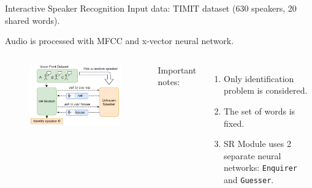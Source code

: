 \documentclass[11pt, aspectratio=169]{beamer}
\newcommand{\guesser}{\texttt{Guesser}}
\newcommand{\enquirer}{\texttt{Enquirer}}
\newcommand{\rimgscale}{0.7}
\begin{document}
\begin{frame}{Interactive Speaker Recognition}
    Input data: TIMIT dataset (630 speakers, 20 shared words).

    Audio is processed with MFCC and x-vector neural network.

    \begin{columns}[c]
        \begin{figure}[bht]
            \includegraphics[scale=\rimgscale]{isr_game.png}
        \end{figure}

        Important notes:
        \begin{enumerate}
            \item Only identification problem is considered.
            \item The set of words is fixed.
            \item SR Module uses 2 separate neural networks: \enquirer{} and
            \guesser{}.
        \end{enumerate}
        \end{columns}
\end{frame}
\end{document}

